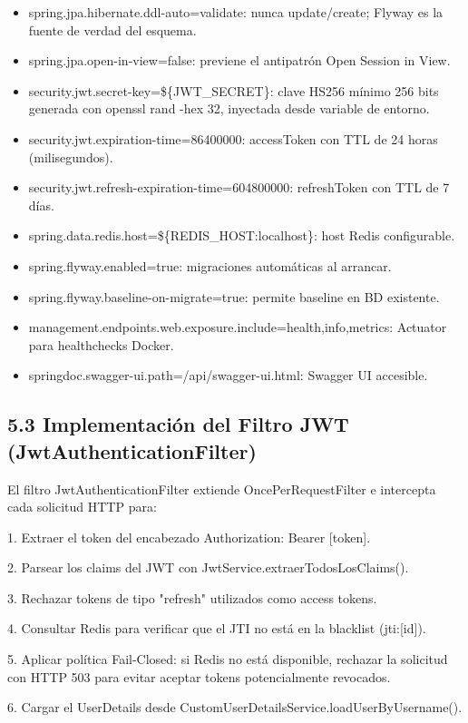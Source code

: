 \documentclass[
]{article}
\begin{document}
\begin{itemize}
\item
  spring.jpa.hibernate.ddl-auto=validate: nunca update/create; Flyway es
  la fuente de verdad del esquema.
\item
  spring.jpa.open-in-view=false: previene el antipatrón Open Session in
  View.
\item
  security.jwt.secret-key=\$\{JWT\_SECRET\}: clave HS256 mínimo 256 bits
  generada con openssl rand -hex 32, inyectada desde variable de
  entorno.
\item
  security.jwt.expiration-time=86400000: accessToken con TTL de 24 horas
  (milisegundos).
\item
  security.jwt.refresh-expiration-time=604800000: refreshToken con TTL
  de 7 días.
\item
  spring.data.redis.host=\$\{REDIS\_HOST:localhost\}: host Redis
  configurable.
\item
  spring.flyway.enabled=true: migraciones automáticas al arrancar.
\item
  spring.flyway.baseline-on-migrate=true: permite baseline en BD
  existente.
\item
  management.endpoints.web.exposure.include=health,info,metrics:
  Actuator para healthchecks Docker.
\item
  springdoc.swagger-ui.path=/api/swagger-ui.html: Swagger UI accesible.
\end{itemize}

\subsection{5.3 Implementación del Filtro JWT
(JwtAuthenticationFilter)}

El filtro JwtAuthenticationFilter extiende OncePerRequestFilter e
intercepta cada solicitud HTTP para:

1. Extraer el token del encabezado Authorization: Bearer {[}token{]}.

2. Parsear los claims del JWT con JwtService.extraerTodosLosClaims().

3. Rechazar tokens de tipo "refresh" utilizados como access tokens.

4. Consultar Redis para verificar que el JTI no está en la blacklist
(jti:{[}id{]}).

5. Aplicar política Fail-Closed: si Redis no está disponible, rechazar
la solicitud con HTTP 503 para evitar aceptar tokens potencialmente
revocados.

6. Cargar el UserDetails desde
CustomUserDetailsService.loadUserByUsername().
\end{document}
